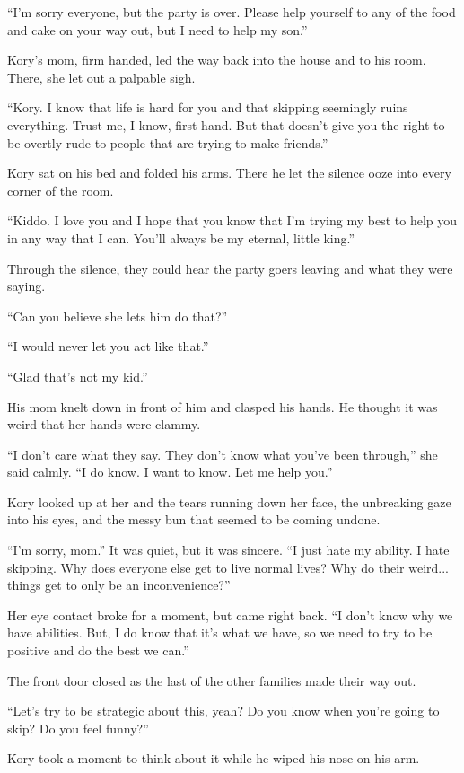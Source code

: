 ``I'm sorry everyone, but the party is over. Please help yourself to any of the food and cake on your way out, but I need to help my son.''

Kory's mom, firm handed, led the way back into the house and to his room. There, she let out a palpable sigh.

``Kory. I know that life is hard for you and that skipping seemingly ruins everything. Trust me, I know, first-hand. But that doesn't give you the right to be overtly rude to people that are trying to make friends.''

Kory sat on his bed and folded his arms. There he let the silence ooze into every corner of the room.

``Kiddo. I love you and I hope that you know that I'm trying my best to help you in any way that I can. You'll always be my eternal, little king.''

Through the silence, they could hear the party goers leaving and what they were saying.

``Can you believe she lets him do that?''

``I would never let you act like that.''

``Glad that's not my kid.''

His mom knelt down in front of him and clasped his hands. He thought it was weird that her hands were clammy.

``I don't care what they say. They don't know what you've been through,'' she said calmly. ``I do know. I want to know. Let me help you.''

Kory looked up at her and the tears running down her face, the unbreaking gaze into his eyes, and the messy bun that seemed to be coming undone.

``I'm sorry, mom.'' It was quiet, but it was sincere. ``I just hate my ability. I hate skipping. Why does everyone else get to live normal lives? Why do their weird... things get to only be an inconvenience?''

Her eye contact broke for a moment, but came right back. ``I don't know why we have abilities. But, I do know that it's what we have, so we need to try to be positive and do the best we can.''

The front door closed as the last of the other families made their way out.

``Let's try to be strategic about this, yeah? Do you know when you're going to skip? Do you feel funny?''

Kory took a moment to think about it while he wiped his nose on his arm.

